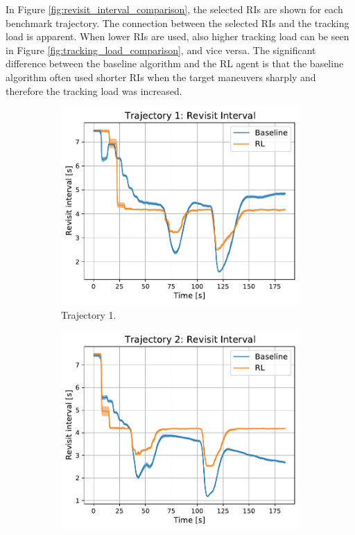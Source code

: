 \documentclass[english, 12pt, a4paper, elec, utf8, a-1b, online]{aaltothesis}
\numberwithin{equation}{section}
\begin{document}
In Figure \ref{fig:revisit_interval_comparison}, the selected RIs are shown for each benchmark trajectory.
The connection between the selected RIs and the tracking load is apparent.
When lower RIs are used, also higher tracking load can be seen in Figure \ref{fig:tracking_load_comparison}, and vice versa.
The significant difference between the baseline algorithm and the RL agent is that the baseline algorithm often used shorter RIs when the target maneuvers sharply and therefore the tracking load was increased.

\begin{figure}
    \centering
    \begin{subfigure}[b]{0.45\textwidth}
        \centering
        \includegraphics[width=\linewidth]{figures/benchmark/Simulations/revisit_intervals_0.pdf}
        \caption{Trajectory 1.}
        \label{fig:RI_T1}
    \end{subfigure}
    \hfill
    \begin{subfigure}[b]{0.45\textwidth}
        \centering
        \includegraphics[width=\linewidth]{figures/benchmark/Simulations/revisit_intervals_1.pdf}

\end{subfigure}
\end{figure}
\end{document}
